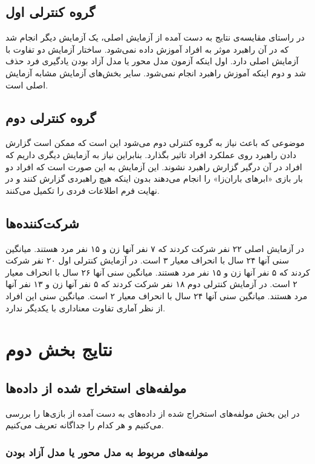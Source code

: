 \documentclass[twoside, a4paper,11pt]{book}
\numberwithin{equation}{chapter}
\numberwithin{table}{chapter}
\numberwithin{figure}{chapter}
\numberwithin{equation}{chapter}
\begin{document}
\subsection{گروه کنترلی اول}

در راستای مقایسه‌ی نتایج به دست آمده از آزمایش اصلی، یک آزمایش دیگر انجام شد که در آن راهبرد موثر به افراد آموزش داده نمی‌شود. ساختار آزمایش دو تفاوت با آزمایش اصلی دارد. اول اینکه آزمون مدل محور یا مدل آزاد بودن یادگیری فرد حذف شد و دوم اینکه آموزش راهبرد انجام نمی‌شود. سایر بخش‌های آزمایش مشابه آزمایش اصلی است.

\subsection{گروه کنترلی دوم}

موضوعی که باعث نیاز به گروه کنترلی دوم می‌شود این است که ممکن است گزارش دادن راهبرد روی عملکرد افراد تاثیر بگذارد. بنابراین نیاز به آزمایش دیگری داریم که افراد در آن درگیر گزارش راهبرد نشوند. این آزمایش به این صورت است که افراد دو بار بازی «ابرهای باران‌زا» را انجام می‌دهند بدون اینکه هیچ راهبردی گزارش کنند و در نهایت فرم اطلاعات فردی را تکمیل می‌کنند.

\subsection{شرکت‌کننده‌ها}

در آزمایش اصلی ۲۲ نفر شرکت کردند که ۷ نفر آنها زن و ۱۵ نفر مرد هستند. میانگین سنی آنها ۲۴ سال با انحراف معیار ۳ است. در آزمایش کنترلی اول ۲۰ نفر شرکت کردند که ۵ نفر آنها زن و ۱۵ نفر مرد هستند. میانگین سنی آنها ۲۶ سال با انحراف معیار ۲ است. در آزمایش کنترلی دوم ۱۸ نفر شرکت کردند که ۵ نفر آنها زن و ۱۳ نفر آنها مرد هستند. میانگین سنی آنها ۲۴ سال با انحراف معیار ۲ است. میانگین سنی این افراد از نظر آماری تفاوت معناداری با یکدیگر ندارد.

\section{نتایج بخش دوم}

\subsection{مولفه‌های استخراج شده از داده‌ها}
در این بخش مولفه‌های استخراج شده از داده‌های به دست آمده از بازی‌ها را بررسی می‌کنیم و هر کدام را جداگانه تعریف می‌کنیم.
\subsubsection{مولفه‌های مربوط به مدل محور یا مدل آزاد بودن}
\end{document}
